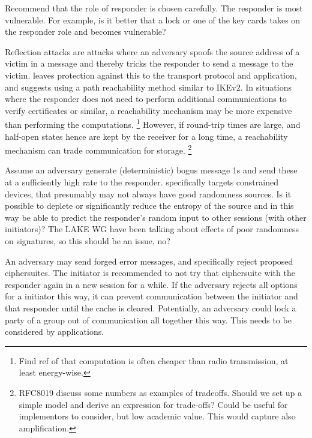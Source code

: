 \documentclass[runningheads]{llncs}
\begin{document}
Recommend that the role of responder is chosen carefully.
%
The responder is most vulnerable.
%
For example, is it better that a lock or one of the key cards takes on the
responder role and becomes vulnerable?
%


Reflection attacks are attacks where an adversary spoofs the source address of a
victim in a message and thereby tricks the responder to send a message to the
victim.
%
\mEdhoc{} leaves protection against this to the transport protocol and
application, and suggests using a path reachability method similar to IKEv2.
%
In situations where the responder does not need to perform additional
communications to verify certificates or similar, a reachability mechanism may
be more expensive than performing the computations.
\footnote{Find ref of that computation is often cheaper than radio
transmission, at least energy-wise.}
%
However, if round-trip times are large, and half-open states hence are kept
by the receiver for a long time, a reachability mechanism can trade
communication for storage.
\footnote{RFC8019 discuss some numbers as examples of tradeoffs. Should we set
up a simple model and derive an expression for trade-offs? Could be useful for
implementors to consider, but low academic value. This would capture also
amplification.}
%

Assume an adversary generate (deterministic) bogus message 1s and send these at
a sufficiently high rate to the responder.
%
\mEdhoc{} specifically targets constrained devices, that presumably may not
always have good randomness sources.
%
Is it possible to deplete or significantly reduce the entropy of the source and
in this way be able to predict the responder's random input to other sessions
(with other initiators)?
%
The LAKE WG have been talking about effects of poor randomness on signatures, so
this should be an issue, no?
%

An adversary may send forged error messages, and specifically reject proposed
ciphersuites.
%
The initiator is recommended to not try that ciphersuite with the responder
again in a new session for a while.
%
If the adversary rejects all options for a initiator this way, it can prevent
communication between the initiator and that responder until the cache is
cleared.
%
Potentially, an adversary could lock a party of a group out of communication all
together this way.
%
This needs to be considered by applications.
%
\end{document}
